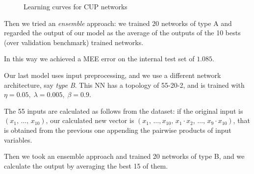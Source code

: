 \begin{figure}[h]
    \centering
    \caption{Learning curves for CUP networks}
\end{figure}


Then we tried an \emph{ensemble} approach: we trained 20 networks of type A and regarded the output of our model as the average of the outputs of the 10 bests (over validation benchmark) trained networks.

In this way we achieved a MEE error on the internal test set of $1.085$.

\bigskip
Our last model uses input preprocessing, and we use a different network architecture, say \emph{type B}.
This NN has a topology of 55-20-2, and is trained with $\eta=0.05,\; \lambda=0.005,\; \beta=0.9$.

The 55 inputs are calculated as follows from the dataset: if the original input is $(x_1,\, \dots,\, x_{10})$, our calculated new vector is $(x_1,\, \dots,x_{10},\, x_1\cdot x_2,\, \dots,\, x_9\cdot x_{10})$, that is obtained from the previous one appending the pairwise products of input variables.

Then we took an ensemble approach and trained 20 networks of type B, and we calculate the output by averaging the best 15 of them.

